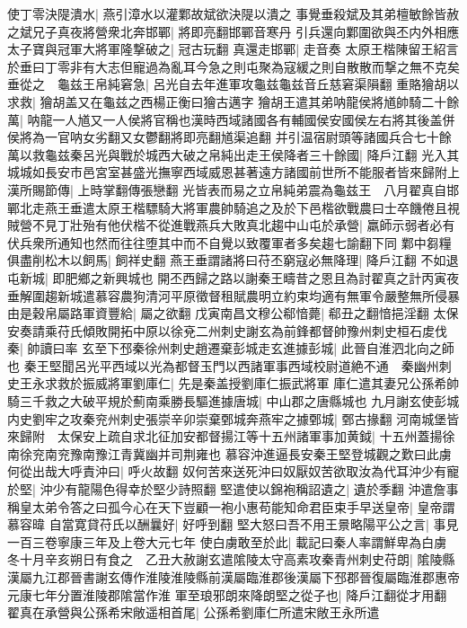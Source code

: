 使丁零決隄潰水|{
	燕引漳水以灌鄴故斌欲決隄以潰之}
事覺垂殺斌及其弟檀敏餘皆赦之斌兄子真夜將營衆北奔邯鄲|{
	將即亮翻邯鄲音寒丹}
引兵還向鄴圍欲與丕内外相應太子寶與冠軍大將軍隆撃破之|{
	冠古玩翻}
真還走邯鄲|{
	走音奏}
太原王楷陳留王紹言於垂曰丁零非有大志但寵過為亂耳今急之則屯聚為寇緩之則自散散而撃之無不克矣垂從之　龜兹王帛純窘急|{
	呂光自去年進軍攻龜兹龜兹音丘慈窘渠隕翻}
重賂獪胡以求救|{
	獪胡盖又在龜兹之西楊正衡曰獪古邁字}
獪胡王遣其弟呐龍侯將馗帥騎二十餘萬|{
	呐龍一人馗又一人侯將官稱也漢時西域諸國各有輔國侯安國侯左右將其後盖併侯將為一官呐女劣翻又女鬱翻將即亮翻馗渠追翻}
并引温宿尉頭等諸國兵合七十餘萬以救龜兹秦呂光與戰於城西大破之帛純出走王侯降者三十餘國|{
	降戶江翻}
光入其城城如長安市邑宮室甚盛光撫寧西域威恩甚著遠方諸國前世所不能服者皆來歸附上漢所賜節傳|{
	上時掌翻傳張戀翻}
光皆表而易之立帛純弟震為龜兹王　八月翟真自邯鄲北走燕王垂遣太原王楷驃騎大將軍農帥騎追之及於下邑楷欲戰農曰士卒饑倦且視賊營不見丁壯殆有他伏楷不從進戰燕兵大敗真北趨中山屯於承營|{
	羸師示弱者必有伏兵衆所通知也然而往往堕其中而不自覺以致覆軍者多矣趨七諭翻下同}
鄴中芻糧俱盡削松木以飼馬|{
	飼祥史翻}
燕王垂謂諸將曰苻丕窮寇必無降理|{
	降戶江翻}
不如退屯新城|{
	即肥鄉之新興城也}
開丕西歸之路以謝秦王疇昔之恩且為討翟真之計丙寅夜垂解圍趨新城遣慕容農狗清河平原徵督租賦農明立約束均適有無軍令嚴整無所侵暴由是穀帛屬路軍資豐給|{
	屬之欲翻}
戊寅南昌文穆公郗愔薨|{
	郗丑之翻愔挹淫翻}
太保安奏請乘苻氏傾敗開拓中原以徐兗二州刺史謝玄為前鋒都督帥豫州刺史桓石䖍伐秦|{
	帥讀曰率}
玄至下邳秦徐州刺史趙遷棄彭城走玄進據彭城|{
	此晉自淮泗北向之師也}
秦王堅聞呂光平西域以光為都督玉門以西諸軍事西域校尉道絶不通　秦幽州刺史王永求救於振威將軍劉庫仁|{
	先是秦盖授劉庫仁振武將軍}
庫仁遣其妻兄公孫希帥騎三千救之大破平規於薊南乘勝長驅進據唐城|{
	中山郡之唐縣城也}
九月謝玄使彭城内史劉牢之攻秦兖州刺史張崇辛卯崇棄鄄城奔燕牢之據鄄城|{
	鄄古掾翻}
河南城堡皆來歸附　太保安上疏自求北征加安都督揚江等十五州諸軍事加黄鉞|{
	十五州蓋揚徐南徐兖南兖豫南豫江青冀幽并司荆雍也}
慕容沖進逼長安秦王堅登城觀之歎曰此虜何從出哉大呼責沖曰|{
	呼火故翻}
奴何苦來送死沖曰奴厭奴苦欲取汝為代耳沖少有寵於堅|{
	沖少有龍陽色得幸於堅少詩照翻}
堅遣使以錦袍稱詔遺之|{
	遺於季翻}
沖遣詹事稱皇太弟令答之曰孤今心在天下豈顧一袍小惠苟能知命君臣束手早送皇帝|{
	皇帝謂慕容暐}
自當寛貸苻氏以酬曩好|{
	好呼到翻}
堅大怒曰吾不用王㬌略陽平公之言|{
	事見一百三卷寧康三年及上卷大元七年}
使白虜敢至於此|{
	載記曰秦人率謂鮮卑為白虜}
冬十月辛亥朔日有食之　乙丑大赦謝玄遣隂陵太守高素攻秦青州刺史苻朗|{
	隂陵縣漢屬九江郡晉書謝玄傳作淮陵淮陵縣前漢屬臨淮郡後漢屬下邳郡晉復屬臨淮郡惠帝元康七年分置淮陵郡隂當作淮}
軍至琅邪朗來降朗堅之從子也|{
	降戶江翻從才用翻}
翟真在承營與公孫希宋敞遥相首尾|{
	公孫希劉庫仁所遣宋敞王永所遣}
